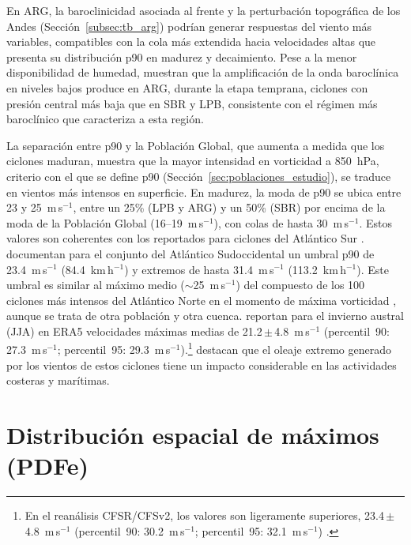 En ARG, la baroclinicidad asociada al frente y la perturbación topográfica de los Andes (Sección~\ref{subsec:tb_arg}) podrían generar respuestas del viento más variables, compatibles con la cola más extendida hacia velocidades altas que presenta su distribución p90 en madurez y decaimiento.
Pese a la menor disponibilidad de humedad, \citet{gramcianinov2024early} muestran que la amplificación de la onda baroclínica en niveles bajos produce en ARG, durante la etapa temprana, ciclones con presión central más baja que en SBR y LPB, consistente con el régimen más baroclínico que caracteriza a esta región.

La separación entre p90 y la Población Global, que aumenta a medida que los ciclones maduran, muestra que la mayor intensidad en vorticidad a 850~hPa, criterio con el que se define p90 (Sección~\ref{sec:poblaciones_estudio}), se traduce en vientos más intensos en superficie.
En madurez, la moda de p90 se ubica entre 23 y 25~m\,s$^{-1}$, entre un 25\% (LPB y ARG) y un 50\% (SBR) por encima de la moda de la Población Global (16--19~m\,s$^{-1}$), con colas de hasta 30~m\,s$^{-1}$. 
Estos valores son coherentes con los reportados para ciclones del Atlántico Sur \citep{padilhareinke2026characterization, gramcianinov2020analysis}.
\citet{padilhareinke2026characterization} documentan para el conjunto del Atlántico Sudoccidental un umbral p90 de 23.4~m\,s$^{-1}$ (84.4~km\,h$^{-1}$) y extremos de hasta 31.4~m\,s$^{-1}$ (113.2~km\,h$^{-1}$).
Este umbral es similar al máximo medio (${\sim}$25~m\,s$^{-1}$) del compuesto de los 100 ciclones más intensos del Atlántico Norte en el momento de máxima vorticidad \citep{gentile2025response}, aunque se trata de otra población y otra cuenca.
\citet{gramcianinov2020analysis} reportan para el invierno austral (JJA) en ERA5 velocidades máximas medias de 21.2\,$\pm$\,4.8~m\,s$^{-1}$ (percentil~90: 27.3~m\,s$^{-1}$; percentil~95: 29.3~m\,s$^{-1}$).\footnote{En el reanálisis CFSR/CFSv2, los valores son ligeramente superiores, 23.4\,$\pm$\,4.8~m\,s$^{-1}$ (percentil~90: 30.2~m\,s$^{-1}$; percentil~95: 32.1~m\,s$^{-1}$) \citep{gramcianinov2020analysis}.} 
\citet{gramcianinov2023impact} destacan que el oleaje extremo generado por los vientos de estos ciclones tiene un impacto considerable en las actividades costeras y marítimas.


\section{Distribución espacial de máximos (PDFe)}\label{sec:pdfe_wind10}
